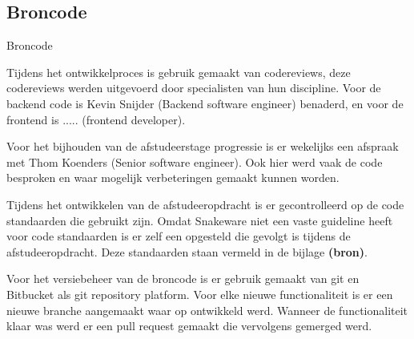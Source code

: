\subsection{Broncode}
Broncode

Tijdens het ontwikkelproces is gebruik gemaakt van codereviews, deze codereviews werden uitgevoerd door specialisten van hun discipline.
Voor de backend code is Kevin Snijder (Backend software engineer) benaderd, en voor de frontend is ..... (frontend developer).

\whitespace
Voor het bijhouden van de afstudeerstage progressie is er wekelijks een afspraak met Thom Koenders (Senior software engineer).
Ook hier werd vaak de code besproken en waar mogelijk verbeteringen gemaakt kunnen worden.

Tijdens het ontwikkelen van de afstudeeropdracht is er gecontrolleerd op de code standaarden die gebruikt zijn.
Omdat Snakeware niet een vaste guideline heeft voor code standaarden is er zelf een opgesteld die gevolgt is tijdens de afstudeeropdracht.
Deze standaarden staan vermeld in de bijlage \textbf{(bron)}.

\whitespace
Voor het versiebeheer van de broncode is er gebruik gemaakt van git en Bitbucket als git repository platform. 
Voor elke nieuwe functionaliteit is er een nieuwe branche aangemaakt waar op ontwikkeld werd.
Wanneer de functionaliteit klaar was werd er een pull request gemaakt die vervolgens gemerged werd.
